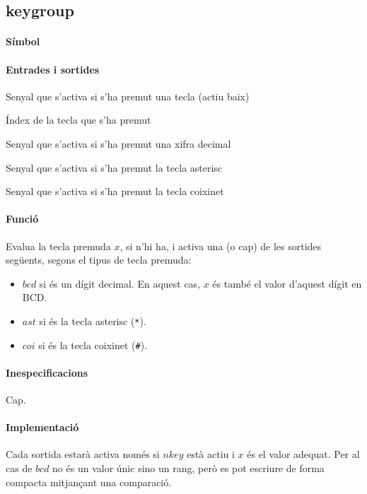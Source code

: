 \subsection{\label{sub:\projectname-keygroup} \textsf{keygroup}}

\paragraph{Símbol}

\begin{center}  \end{center}

\paragraph{Entrades i sortides}

\begin{where}
\item[\nodenamebit{nkey}] Senyal que s'activa si s'ha premut una tecla (actiu baix)
\item[\nodenamerange{x}{3}{0}] Índex de la tecla que s'ha premut
\item[\nodenamebit{bcd}] Senyal que s'activa si s'ha premut una xifra decimal
\item[\nodenamebit{ast}] Senyal que s'activa si s'ha premut la tecla asterisc
\item[\nodenamebit{coi}] Senyal que s'activa si s'ha premut la tecla coixinet
\end{where}

\paragraph{Funció}

Evalua la tecla premuda $x$, si n'hi ha, i activa una (o cap) de les sortides següents,
segons el tipus de tecla premuda:

\begin{itemize}
\item $bcd$ si és un dígit decimal. En aquest cas, $x$ és també
el valor d'aquest dígit en BCD.
\item $ast$ si és la tecla asterisc (\texttt{*}).
\item $coi$ si és la tecla coixinet (\texttt{\#}).
\end{itemize}

\paragraph{Inespecificacions}

Cap.

\paragraph{Implementació}




Cada sortida estarà activa només si $nkey$ està actiu i $x$ és el valor adequat.
Per al cas de $bcd$ no és un valor únic sino un rang, però es pot escriure de
forma compacta mitjançant una comparació.

\vspace{1cm}
